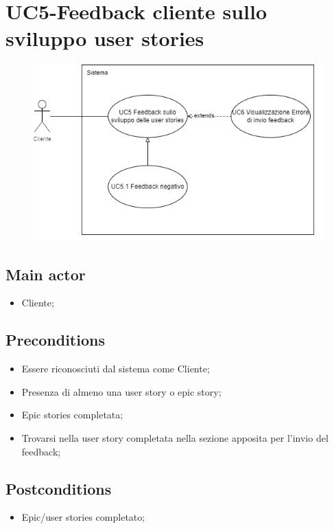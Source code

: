 \documentclass{article}
\begin{document}
\section{UC5-Feedback cliente sullo sviluppo user stories}
    \begin{figure}[h]
      \centering
      \includegraphics{documenti/imgUML/UC5.png}
      \label{fig:immagine}
    \end{figure}
    
    \subsection*{Main actor}
    \begin{itemize}
        \item Cliente;
    \end{itemize}
    
    \subsection*{Preconditions}
    \begin{itemize}
        \item Essere riconosciuti dal sistema come Cliente;
        \item Presenza di almeno una user story o epic story;
        \item Epic stories completata;
        \item Trovarsi nella user story completata nella sezione apposita per l'invio del feedback;
    \end{itemize}
    
    \subsection*{Postconditions}
    \begin{itemize}
        \item Epic/user stories completato;
    \end{itemize}
    
\end{document}
